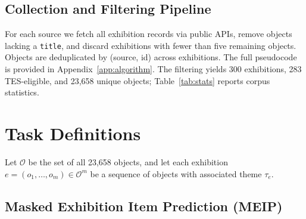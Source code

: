 \documentclass[11pt]{article}
\newcommand{\bench}{\textsc{ExhibitionBench}}
\newcommand{\meip}{\textsc{MEIP}}
\begin{document}
\subsection{Collection and Filtering Pipeline}
\label{sec:pipeline}

For each source we fetch all exhibition records via public APIs,
remove objects lacking a \texttt{title}, and discard exhibitions with fewer than
five remaining objects.
Objects are deduplicated by (source, id) across exhibitions.
The full pseudocode is provided in Appendix~\ref{app:algorithm}.
The filtering yields 300 exhibitions, 283 TES-eligible, and
23{,}658 unique objects; Table~\ref{tab:stats} reports corpus statistics.

\begin{table}[!t]
\centering\small
{}
\caption{Data sources in \bench{}. All licences are CC0 / Public Domain.}
\label{tab:sources}
\end{table}
\section{Task Definitions}
\label{sec:tasks}

Let $\mathcal{O}$ be the set of all 23{,}658 objects, and let each
exhibition $e = (o_1, \ldots, o_m) \in \mathcal{O}^m$ be a sequence
of objects with associated theme $\tau_e$.

\subsection{Masked Exhibition Item Prediction (\meip{})}
\label{sec:meip}
\end{document}
